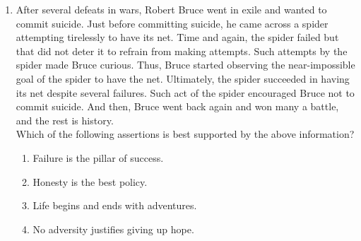 \documentclass[journal,12pt,onecolumn]{IEEEtran}
\theoremstyle{remark}
\begin{document}
\begin{enumerate}
the current wages and the working hours decrease by $\frac{1}{24}$ of the current period, then the new cost
of erection in Rs. is
\begin{multicols}{4}
    \begin{enumerate}
        \item $16,500$
        \item $15,180$
        \item $11,000$
        \item $10,120$
    \end{enumerate}
\end{multicols}
\item After several defeats in wars, Robert Bruce went in exile and wanted to commit suicide. Just before
committing suicide, he came across a spider attempting tirelessly to have its net. Time and again,
the spider failed but that did not deter it to refrain from making attempts. Such attempts by the
spider made Bruce curious. Thus, Bruce started observing the near-impossible goal of the spider to
have the net. Ultimately, the spider succeeded in having its net despite several failures. Such act of
the spider encouraged Bruce not to commit suicide. And then, Bruce went back again and won
many a battle, and the rest is history.\\
Which of the following assertions is best supported by the above information?
\begin{enumerate}
    \item Failure is the pillar of success.
    \item Honesty is the best policy.
    \item Life begins and ends with adventures.
    \item No adversity justifies giving up hope.
\end{enumerate}
\end{enumerate}
\end{document}
